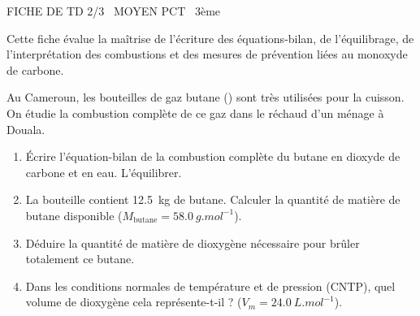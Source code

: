 \documentclass[11pt]{article}
\begin{document}
\begin{tcolorbox}[enhanced,colback=popink,colframe=popink,arc=10pt,boxrule=0pt,left=12pt,right=12pt,top=9pt,bottom=9pt]
{\color{white}\popxbold\small FICHE DE TD 2/3 \textbullet\ MOYEN \hfill PCT \textbullet\ 3ème\par}
\end{tcolorbox}
\vspace{4pt}
Cette fiche évalue la maîtrise de l'écriture des équations-bilan, de l'équilibrage, de l'interprétation des combustions et des mesures de prévention liées au monoxyde de carbone.

\begin{exercice}
Au Cameroun, les bouteilles de gaz butane () sont très utilisées pour la cuisson. On étudie la combustion complète de ce gaz dans le réchaud d'un ménage à Douala.
\begin{enumerate}
    \item Écrire l'équation-bilan de la combustion complète du butane en dioxyde de carbone et en eau. L'équilibrer.
    \item La bouteille contient \SI{12,5}{kg} de butane. Calculer la quantité de matière de butane disponible ($M_{\text{butane}} = \SI{58,0}{g.mol^{-1}}$).
    \item Déduire la quantité de matière de dioxygène  nécessaire pour brûler totalement ce butane.
    \item Dans les conditions normales de température et de pression (CNTP), quel volume de dioxygène cela représente-t-il ? ($V_m = \SI{24,0}{L.mol^{-1}}$).
\end{enumerate}
\end{exercice}
\end{document}
